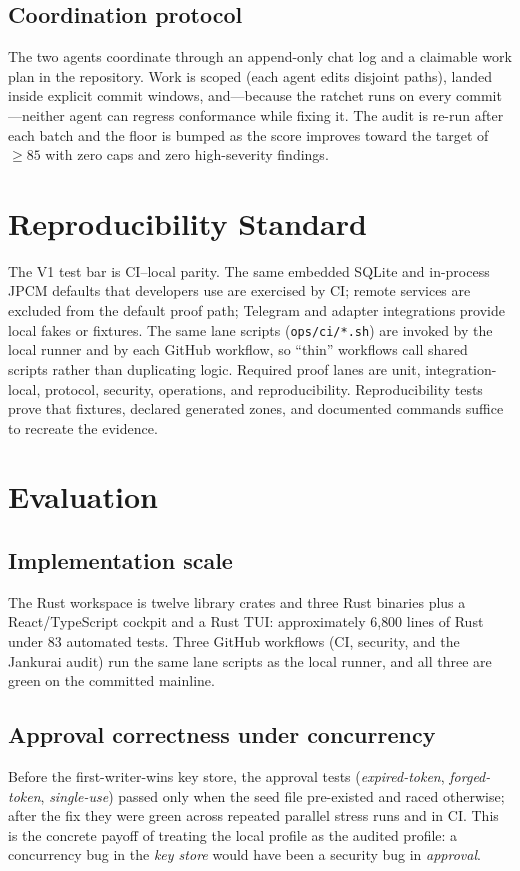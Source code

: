 \documentclass[conference]{IEEEtran}
\begin{document}
\subsection{Coordination protocol}
The two agents coordinate through an append-only chat log and a claimable work
plan in the repository. Work is scoped (each agent edits disjoint paths),
landed inside explicit commit windows, and---because the ratchet runs on every
commit---neither agent can regress conformance while fixing it. The audit is
re-run after each batch and the floor is bumped as the score improves toward the
target of $\geq 85$ with zero caps and zero high-severity findings.

\section{Reproducibility Standard}

The V1 test bar is CI--local parity. The same embedded SQLite and in-process
JPCM defaults that developers use are exercised by CI; remote services are
excluded from the default proof path; Telegram and adapter integrations provide
local fakes or fixtures. The same lane scripts (\texttt{ops/ci/*.sh}) are
invoked by the local runner and by each GitHub workflow, so ``thin'' workflows
call shared scripts rather than duplicating logic. Required proof lanes are
unit, integration-local, protocol, security, operations, and reproducibility.
Reproducibility tests prove that fixtures, declared generated zones, and
documented commands suffice to recreate the evidence.

\section{Evaluation}
\label{sec:eval}

\subsection{Implementation scale}
The Rust workspace is twelve library crates and three Rust binaries plus a
React/TypeScript cockpit and a Rust TUI: approximately 6{,}800 lines of Rust
under 83 automated tests. Three GitHub workflows (CI, security, and the
Jankurai audit) run the same lane scripts as the local runner, and all three
are green on the committed mainline.

\subsection{Approval correctness under concurrency}
Before the first-writer-wins key store, the approval tests
(\emph{expired-token}, \emph{forged-token}, \emph{single-use}) passed only when
the seed file pre-existed and raced otherwise; after the fix they were green
across repeated parallel stress runs and in CI. This is the concrete payoff of
treating the local profile as the audited profile: a concurrency bug in the
\emph{key store} would have been a security bug in \emph{approval}.
\end{document}
